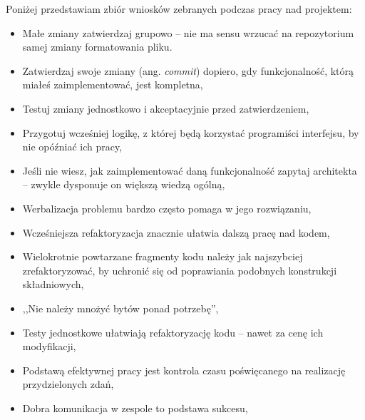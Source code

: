 Poniżej przedstawiam zbiór wniosków zebranych podczas pracy nad projektem:
\begin{itemize}
\item Małe zmiany zatwierdzaj grupowo -- nie ma sensu wrzucać na repozytorium samej zmiany formatowania pliku.
\item Zatwierdzaj swoje zmiany (ang. \emph{commit}) dopiero, gdy funkcjonalność, którą miałeś zaimplementować, jest kompletna,
\item Testuj zmiany jednostkowo i akceptacyjnie przed zatwierdzeniem,
\item Przygotuj wcześniej logikę, z której będą korzystać programiści interfejsu, by nie opóźniać ich pracy,
\item Jeśli nie wiesz, jak zaimplementować daną funkcjonalność zapytaj architekta -- zwykle dysponuje on większą wiedzą ogólną,
\item Werbalizacja problemu bardzo często pomaga w jego rozwiązaniu,
\item Wcześniejsza refaktoryzacja znacznie ułatwia dalszą pracę nad kodem,
\item Wielokrotnie powtarzane fragmenty kodu należy jak najszybciej zrefaktoryzować, by uchronić się od poprawiania podobnych konstrukcji składniowych,
\item ,,Nie należy mnożyć bytów ponad potrzebę'',
\item Testy jednostkowe ułatwiają refaktoryzację kodu -- nawet za cenę ich modyfikacji,
\item Podstawą efektywnej pracy jest kontrola czasu poświęcanego na realizację przydzielonych zdań,
\item Dobra komunikacja w zespole to podstawa sukcesu,
\end{itemize}